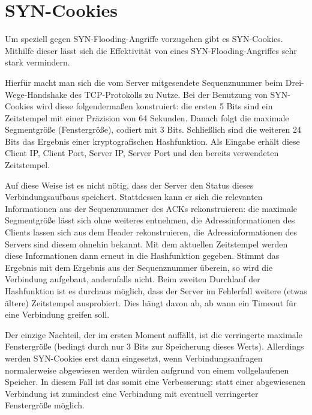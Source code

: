 \section{SYN-Cookies}
Um speziell gegen SYN-Flooding-Angriffe vorzugehen gibt es SYN-Cookies. Mithilfe dieser lässt sich die Effektivität von eines SYN-Flooding-Angriffes sehr stark vermindern.

Hierfür macht man sich die vom Server mitgesendete Sequenznummer beim Drei-Wege-Handshake des TCP-Protokolls zu Nutze. Bei der Benutzung von SYN-Cookies wird diese folgendermaßen konstruiert: die ersten 5 Bits sind ein Zeitstempel mit einer Präzision von 64 Sekunden. Danach folgt die maximale Segmentgröße (Fenstergröße), codiert mit 3 Bits. Schließlich sind die weiteren 24 Bits das Ergebnis einer kryptografischen Hashfunktion. Als Eingabe erhält diese Client IP, Client Port, Server IP, Server Port und den bereits verwendeten Zeitstempel.

Auf diese Weise ist es nicht nötig, dass der Server den Status dieses Verbindungsaufbaus speichert. Stattdessen kann er sich die relevanten Informationen aus der Sequenznummer des ACKs rekonstruieren: die maximale Segmentgröße lässt sich ohne weiteres entnehmen, die Adressinformationen des Clients lassen sich aus dem Header rekonstruieren, die Adressinformationen des Servers sind diesem ohnehin bekannt. Mit dem aktuellen Zeitstempel werden diese Informationen dann erneut in die Hashfunktion gegeben. Stimmt das Ergebnis mit dem Ergebnis aus der Sequenznummer überein, so wird die Verbindung aufgebaut, andernfalls nicht. Beim zweiten Durchlauf der Hashfunktion ist es durchaus möglich, dass der Server im Fehlerfall weitere (etwas ältere) Zeitstempel ausprobiert. Dies hängt davon ab, ab wann ein Timeout für eine Verbindung greifen soll.

Der einzige Nachteil, der im ersten Moment auffällt, ist die verringerte maximale Fenstergröße (bedingt durch nur 3 Bits zur Speicherung dieses Werts). Allerdings werden SYN-Cookies erst dann eingesetzt, wenn Verbindungsanfragen normalerweise abgewiesen werden würden aufgrund von einem vollgelaufenen Speicher. In diesem Fall ist das somit eine Verbesserung: statt einer abgewiesenen Verbindung ist zumindest eine Verbindung mit eventuell verringerter Fenstergröße möglich. \cite{BernsteinSYN}
